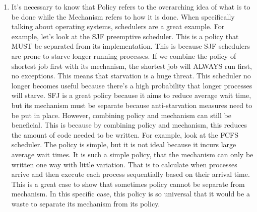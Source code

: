\documentclass[12pt]{article}
\begin{document}
\begin{enumerate}
	\item It's necessary to know that Policy refers to the overarching idea of what is to be done while the Mechanism refers to how it is done. When specifically talking about operating systems, schedulers are a great example. For example, let's look at the SJF preemptive scheduler. This is a policy that MUST be separated from its implementation. This is because SJF schedulers are prone to starve longer running processes. If we combine the policy of shortest job first with its mechanism, the shortest job will ALWAYS run first, no exceptions. This means that starvation is a huge threat. This scheduler no longer becomes useful because there's a high probability that longer processes will starve. SFJ is a great policy because it aims to reduce average wait time, but its mechanism must be separate because anti-starvation measures need to be put in place. However, combining policy and mechanism can still be beneficial. This is because by combining policy and mechanism, this reduces the amount of code needed to be written. For example, look at the FCFS scheduler. The policy is simple, but it is not ideal because it incurs large average wait times. It is such a simple policy, that the mechanism can only be written one way with little variation. That is to calculate when processes arrive and then execute each process sequentially based on their arrival time. This is a great case to show that sometimes policy cannot be separate from mechanism. In this specific case, this policy is so universal that it would be a waste to separate its mechanism from its policy.
	
	
\end{enumerate}
\end{document}
